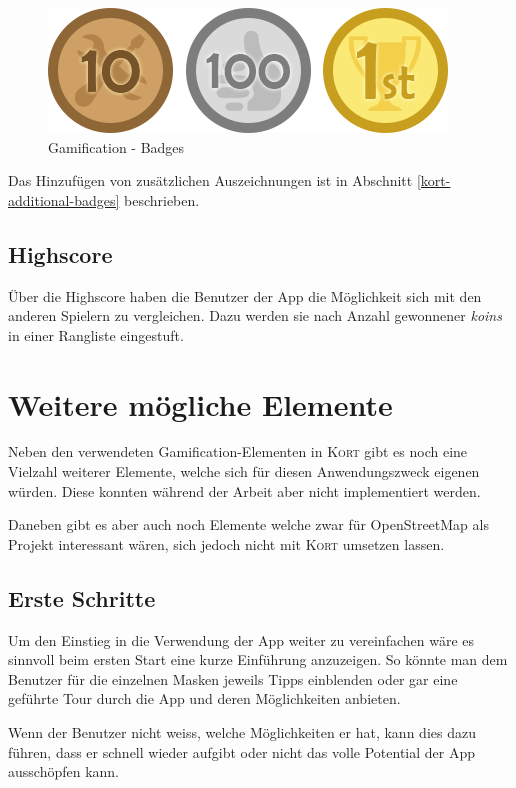 \begin{figure}[H]
	\centering
	\includegraphics[scale=0.7]{images/gamification/gamification-badges}
	\caption{Gamification - Badges}
	\label{gamification-badges}
\end{figure}

Das Hinzufügen von zusätzlichen Auszeichnungen ist in Abschnitt \ref{kort-additional-badges} beschrieben.

\subsection{Highscore}
Über die Highscore haben die Benutzer der App die Möglichkeit sich mit den anderen Spielern zu vergleichen.
Dazu werden sie nach Anzahl gewonnener \emph{koins} in einer Rangliste eingestuft.

\section{Weitere mögliche Elemente}
Neben den verwendeten Gamification-Elementen in \textsc{Kort} gibt es noch eine Vielzahl weiterer Elemente, welche sich für diesen Anwendungszweck eigenen würden.
Diese konnten während der Arbeit aber nicht implementiert werden.

Daneben gibt es aber auch noch Elemente welche zwar für OpenStreetMap als Projekt interessant wären, sich jedoch nicht mit \textsc{Kort} umsetzen lassen.

\subsection{Erste Schritte}
Um den Einstieg in die Verwendung der App weiter zu vereinfachen wäre es sinnvoll beim ersten Start eine kurze Einführung anzuzeigen.
So könnte man dem Benutzer für die einzelnen Masken jeweils Tipps einblenden oder gar eine geführte Tour durch die App und deren Möglichkeiten anbieten.

Wenn der Benutzer nicht weiss, welche Möglichkeiten er hat, kann dies dazu führen, dass er schnell wieder aufgibt oder nicht das volle Potential der App ausschöpfen kann.

